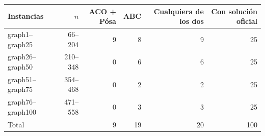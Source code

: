\begin{tabular}{lrrrrr}
\toprule
Instancias & $n$ & ACO + Pósa & ABC & Cualquiera de los dos & Con solución oficial \\
\midrule
graph1--graph25 & 66--204 & 9 & 8 & 9 & 25 \\
graph26--graph50 & 210--348 & 0 & 6 & 6 & 25 \\
graph51--graph75 & 354--468 & 0 & 2 & 2 & 25 \\
graph76--graph100 & 471--558 & 0 & 3 & 3 & 25 \\
\midrule
Total & & 9 & 19 & 20 & 100 \\
\bottomrule
\end{tabular}
